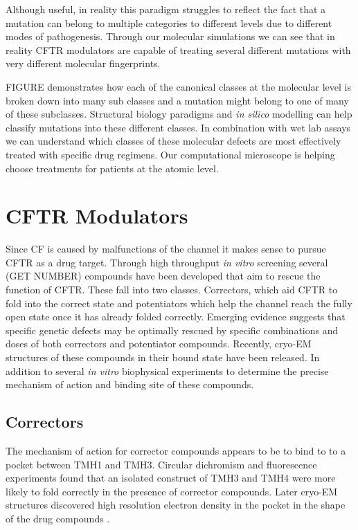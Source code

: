 Although useful, in reality this paradigm struggles to reflect the fact that a mutation can belong to multiple categories to different levels due to different modes of pathogenesis. Through our molecular simulations we can see that in reality CFTR modulators are capable of treating several different mutations with very different molecular fingerprints.

FIGURE demonstrates how each of the canonical classes at the molecular level is broken down into many sub classes and a mutation might belong to one of many of these subclasses. Structural biology paradigms and \textit{in silico} modelling can help classify mutations into these different classes. In combination with wet lab assays we can understand which classes of these molecular defects are most effectively treated with specific drug regimens. Our computational microscope is helping choose treatments for patients at the atomic level. 

\section{CFTR Modulators}
Since CF is caused by malfunctions of the channel it makes sense to pursue CFTR as a drug target. Through high throughput \textit{in vitro} screening several (GET NUMBER) compounds have been developed that aim to rescue the function of CFTR. These fall into two classes. Correctors, which aid CFTR to fold into the correct state and potentiators which help the channel reach the fully open state once it has already folded correctly. Emerging evidence suggests that specific genetic defects may be optimally rescued by specific combinations and doses of both correctors and potentiator compounds. Recently, cryo-EM structures of these compounds in their bound state have been released. In addition to several \textit {in vitro} biophysical experiments to determine the precise mechanism of action and binding site of these compounds.

\subsection{Correctors}
The mechanism of action for corrector compounds appears to be to bind to to a pocket between TMH1 and TMH3. Circular dichromism and fluorescence experiments found that an isolated construct of TMH3 and TMH4 were more likely to fold correctly in the presence of corrector compounds. Later cryo-EM structures discovered high resolution electron density in the pocket in the shape of the drug compounds \cite{fiedorczuk2022}. 

